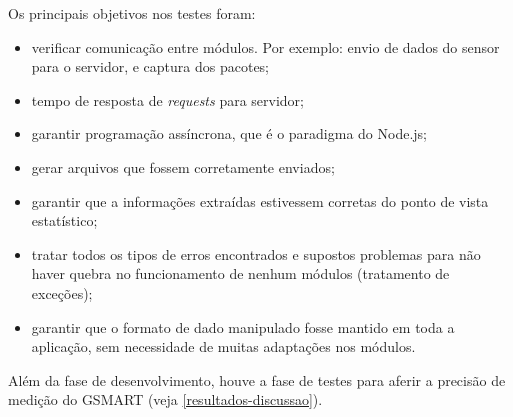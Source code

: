 Os principais objetivos nos testes foram:

\begin{itemize}
  \item verificar comunicação entre módulos. Por exemplo: envio de dados do sensor para o servidor, e captura dos pacotes;
  \item tempo de resposta de \emph{requests} para servidor;
  \item garantir programação assíncrona, que é o paradigma do Node.js;
  \item gerar arquivos que fossem corretamente enviados;
  \item garantir que a informações extraídas estivessem corretas do ponto de vista estatístico;
  \item tratar todos os tipos de erros encontrados e supostos problemas para não haver quebra no funcionamento de nenhum módulos (tratamento de exceções);
  \item garantir que o formato de dado manipulado fosse mantido em toda a aplicação, sem necessidade de muitas adaptações nos módulos.
\end{itemize}

Além da fase de desenvolvimento, houve a fase de testes para aferir a precisão de medição do GSMART (veja \autoref{resultados-discussao}).
